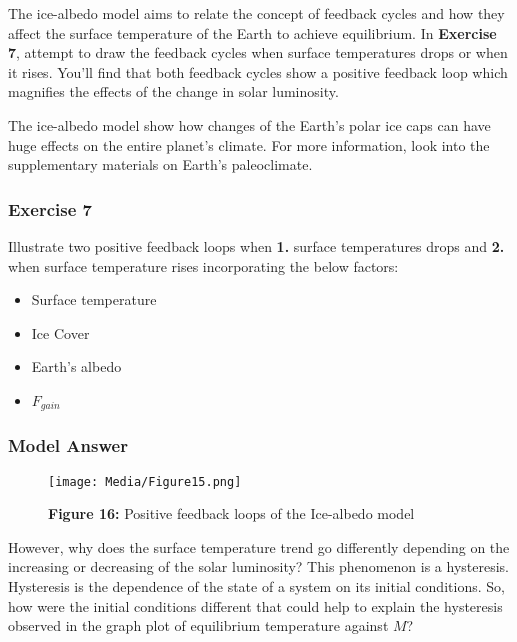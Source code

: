 \documentclass[
  letterpaper,
  DIV=11,
  numbers=noendperiod]{scrartcl}
\providecommand{\tightlist}{%
  \setlength{\itemsep}{0pt}\setlength{\parskip}{0pt}}\usepackage{longtable,booktabs,array}
\begin{document}
The ice-albedo model aims to relate the concept of feedback cycles and
how they affect the surface temperature of the Earth to achieve
equilibrium. In \textbf{Exercise 7}, attempt to draw the feedback cycles
when surface temperatures drops or when it rises. You'll find that both
feedback cycles show a positive feedback loop which magnifies the
effects of the change in solar luminosity.

The ice-albedo model show how changes of the Earth's polar ice caps can
have huge effects on the entire planet's climate. For more information,
look into the supplementary materials on Earth's paleoclimate.

\subsubsection{\texorpdfstring{\textbf{Exercise 7}}{Exercise 7}}

Illustrate two positive feedback loops when \textbf{1.} surface
temperatures drops and \textbf{2.} when surface temperature rises
incorporating the below factors:

\begin{itemize}
\tightlist
\item
  Surface temperature
\item
  Ice Cover
\item
  Earth's albedo
\item
  \(F_{gain}\)
\end{itemize}

\subsubsection{\texorpdfstring{\textbf{Model Answer}}{Model Answer}}

\begin{figure}

{\centering \texttt{[image: Media/Figure15.png]}

}

\caption{\textbf{Figure 16:} Positive feedback loops of the Ice-albedo
model}

\end{figure}

However, why does the surface temperature trend go differently depending
on the increasing or decreasing of the solar luminosity? This phenomenon
is a hysteresis. Hysteresis is the dependence of the state of a system
on its initial conditions. So, how were the initial conditions different
that could help to explain the hysteresis observed in the graph plot of
equilibrium temperature against \(M\)?
\end{document}
